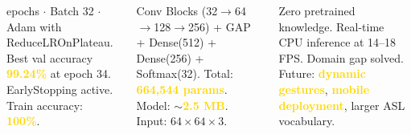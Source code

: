\documentclass[final]{beamer}
\newcommand{\darkcard}[2]{%
  \begin{tcolorbox}[darkcard, title={#1}]#2\end{tcolorbox}%
}
\renewcommand{\small}{\fontsize{10}{12}\selectfont}
\begin{document}
\begin{frame}[t]{}
\begin{tcolorbox}[
  enhanced,
  colback=white,
  colframe=upesblue,
  boxrule=4pt,
  arc=0pt,
  left=10pt, right=10pt, top=10pt, bottom=10pt,
  width=\textwidth,
]
\begin{columns}[T]
\begin{column}{0.32\textwidth}
\darkcard{Training History}{
\small 35 epochs $\cdot$ Batch 32 $\cdot$ Adam with ReduceLROnPlateau. Best val accuracy \textbf{\textcolor{gold}{99.24\%}} at epoch 34. EarlyStopping active. Train accuracy: \textbf{\textcolor{gold}{100\%}}.
}
\end{column}
\begin{column}{0.32\textwidth}
\darkcard{Architecture at a Glance}{
\small 4 Conv Blocks (32$\to$64$\to$128$\to$256) + GAP + Dense(512) + Dense(256) + Softmax(32). Total: \textbf{\textcolor{gold}{664,544 params}}. Model: $\sim$\textbf{\textcolor{gold}{2.5 MB}}. Input: $64\times64\times3$.
}
\end{column}
\begin{column}{0.32\textwidth}
\darkcard{Impact \& Future Work}{
\small Zero pretrained knowledge. Real-time CPU inference at 14--18 FPS. Domain gap solved. Future: \textbf{\textcolor{gold}{dynamic gestures}}, \textbf{\textcolor{gold}{mobile deployment}}, larger ASL vocabulary.
}
\end{column}
\end{columns}

\end{tcolorbox}
\end{frame}
\end{document}
